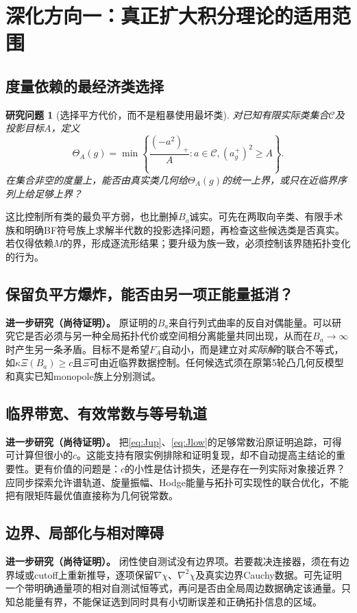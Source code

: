 \documentclass[UTF8,fontset=fandol,zihao=-4]{ctexart}
\theoremstyle{cn}
\newtheorem{problem}[result]{研究问题}
\newcommand{\newidea}{\par\noindent\textbf{进一步研究（尚待证明）。}}
\begin{document}
\section{深化方向一：真正扩大积分理论的适用范围}
\subsection{度量依赖的最经济类选择}
\begin{problem}[选择平方代价，而不是粗暴使用最坏类]
对已知有限实际类集合$\mathscr C$及投影目标$A$，定义
\[
 \Theta_A(g)=\min\left\{\frac{(-a^2)_+}{A}:a\in\mathscr C,
                                      (a_g^+)^2\ge A\right\}.
\]
在集合非空的度量上，能否由真实类几何给$\Theta_A(g)$的统一上界，或只在近临界序列上给足够上界？
\end{problem}
这比控制所有类的最负平方弱，也比删掉$B_a$诚实。可先在两取向辛类、有限手术族和明确BF符号族上求解半代数的投影选择问题，再检查这些候选类是否真实。若仅得依赖$M$的界，形成逐流形结果；要升级为族一致，必须控制该界随拓扑变化的行为。

\subsection{保留负平方爆炸，能否由另一项正能量抵消？}
\newidea
原证明的$B_a$来自行列式曲率的反自对偶能量。可以研究它是否必须与另一种全局拓扑代价或空间相分离能量共同出现，从而在$B_a\to\infty$时产生另一条矛盾。目标不是希望$F_A^-$自动小，而是建立对\emph{实际解}的联合不等式，如$\kappa\Xi(B_a)\ge c$且$\Xi$可由近临界数据控制。任何候选式须在原第5轮凸几何反模型和真实已知monopole族上分别测试。

\subsection{临界带宽、有效常数与等号轨道}
\newidea
把\eqref{eq:Jup}、\eqref{eq:Jlow}的足够常数沿原证明追踪，可得可计算但很小的$c$。这能支持有限实例排除和证明复现，却不自动提高主结论的重要性。更有价值的问题是：$c$的小性是估计损失，还是存在一列实际对象接近界？应同步探索允许谱轨道、旋量振幅、Hodge能量与拓扑可实现性的联合优化，不能把有限矩阵最优值直接称为几何锐常数。

\subsection{边界、局部化与相对障碍}
\newidea
闭性使自测试没有边界项。若要裁决连接器，须在有边界域或cutoff上重新推导，逐项保留$\nabla\chi$、$\nabla^2\chi$及真实边界Cauchy数据。可先证明一个带明确通量项的相对自测试恒等式，再问是否由全局周边数据确定该通量。只知总能量有界，不能保证选到同时具有小切断误差和正确拓扑信息的区域。
\end{document}
